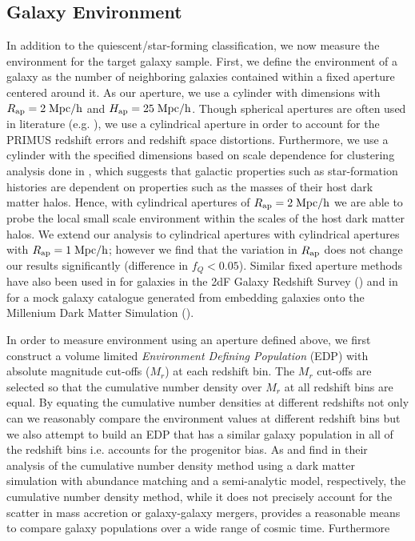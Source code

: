 \documentclass{emulateapj}
\begin{document}
\subsection{Galaxy Environment} \label{sec:environment}
In addition to the quiescent/star-forming classification, we now measure the environment for the target galaxy sample. 
First, we define the environment of a galaxy as the number of neighboring galaxies contained within a fixed aperture centered around it.
As our aperture, we use a cylinder with dimensions with $R_{\rm{ap}} = 2 \; \rm{Mpc}/h$ and $H_{\rm{ap}} = 25 \; \rm{Mpc}/h$. 
Though spherical apertures are often used in literature (e.g. \cite{Croton:2005aa}), we use a cylindrical aperture in order to 
account for the PRIMUS redshift errors and redshift space distortions.  
Furthermore, we use a cylinder with the specified dimensions based on scale dependence for clustering analysis done in 
\cite{Blanton:2006aa}, which suggests that galactic properties such as star-formation histories are dependent on properties
 such as the masses of their host dark matter halos.
Hence, with cylindrical apertures of $R_{\rm{ap}} = 2 \; \rm{Mpc}/h$ we are able to probe the local small scale environment 
within the scales of the host dark matter halos.
We extend our analysis to cylindrical apertures with cylindrical apertures with $R_{\rm{ap}} = 1 \; \rm{Mpc}/h$; however 
we find that the variation in $R_{\rm{ap}}$ does not change our results significantly (difference in $f_{Q} < 0.05$). 
Similar fixed aperture methods have also been used in \cite{Croton:2005aa} for galaxies in the 2dF Galaxy Redshift 
Survey (\cite{Colless:2003aa}) and in \cite{Muldrew:2012aa} for a mock galaxy catalogue generated from embedding 
galaxies onto the Millenium Dark Matter Simulation (\cite{Springel:2005aa}). 

In order to measure environment using an aperture defined above, we first construct a volume limited 
{\em Environment Defining Population} (EDP) with absolute magnitude cut-offs ($M_{r}$) at each redshift bin. 
The $M_{r}$ cut-offs are selected so that the cumulative number density over $M_{r}$ at all redshift bins are equal. 
By equating the cumulative number densities at different redshifts not only can we reasonably compare the 
environment values at different redshift bins but we also attempt to build an EDP that has a similar galaxy 
population in all of the redshift bins i.e. accounts for the progenitor bias. 
As \cite{Behroozi:2013aa} and \cite{Leja:2013aa} find in their analysis of the cumulative number density 
method using a dark matter simulation with abundance matching and a semi-analytic model, respectively, 
the cumulative number density method, while it does not precisely account for the scatter in mass accretion or 
galaxy-galaxy mergers, provides a reasonable means to compare galaxy populations over a wide range of cosmic time. 
Furthermore \cite{Behroozi:2013aa} %
\end{document}

